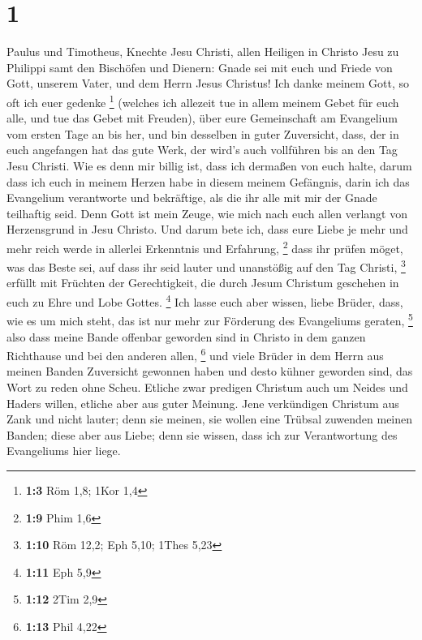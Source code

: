 \hypertarget{section}{%
\section{1}\label{section}}

 Paulus und Timotheus, Knechte Jesu Christi, allen
Heiligen in Christo Jesu zu Philippi samt den Bischöfen und Dienern:
 Gnade sei mit euch und Friede von Gott, unserem Vater,
und dem Herrn Jesus Christus!  Ich danke meinem Gott, so
oft ich euer gedenke \footnote{\textbf{1:3} Röm 1,8; 1Kor 1,4}
 (welches ich allezeit tue in allem meinem Gebet für euch
alle, und tue das Gebet mit Freuden),  über eure
Gemeinschaft am Evangelium vom ersten Tage an bis her, 
und bin desselben in guter Zuversicht, dass, der in euch angefangen hat
das gute Werk, der wird's auch vollführen bis an den Tag Jesu Christi.
 Wie es denn mir billig ist, dass ich dermaßen von euch
halte, darum dass ich euch in meinem Herzen habe in diesem meinem
Gefängnis, darin ich das Evangelium verantworte und bekräftige, als die
ihr alle mit mir der Gnade teilhaftig seid.  Denn Gott ist
mein Zeuge, wie mich nach euch allen verlangt von Herzensgrund in Jesu
Christo.  Und darum bete ich, dass eure Liebe je mehr und
mehr reich werde in allerlei Erkenntnis und Erfahrung, \footnote{\textbf{1:9}
  Phim 1,6}  dass ihr prüfen möget, was das Beste sei,
auf dass ihr seid lauter und unanstößig auf den Tag Christi, \footnote{\textbf{1:10}
  Röm 12,2; Eph 5,10; 1Thes 5,23}  erfüllt mit Früchten
der Gerechtigkeit, die durch Jesum Christum geschehen in euch zu Ehre
und Lobe Gottes. \footnote{\textbf{1:11} Eph 5,9}  Ich
lasse euch aber wissen, liebe Brüder, dass, wie es um mich steht, das
ist nur mehr zur Förderung des Evangeliums geraten, \footnote{\textbf{1:12}
  2Tim 2,9}  also dass meine Bande offenbar geworden sind
in Christo in dem ganzen Richthause und bei den anderen allen,
\footnote{\textbf{1:13} Phil 4,22}  und viele Brüder in
dem Herrn aus meinen Banden Zuversicht gewonnen haben und desto kühner
geworden sind, das Wort zu reden ohne Scheu.  Etliche
zwar predigen Christum auch um Neides und Haders willen, etliche aber
aus guter Meinung.  Jene verkündigen Christum aus Zank
und nicht lauter; denn sie meinen, sie wollen eine Trübsal zuwenden
meinen Banden;  diese aber aus Liebe; denn sie wissen,
dass ich zur Verantwortung des Evangeliums hier liege. 
